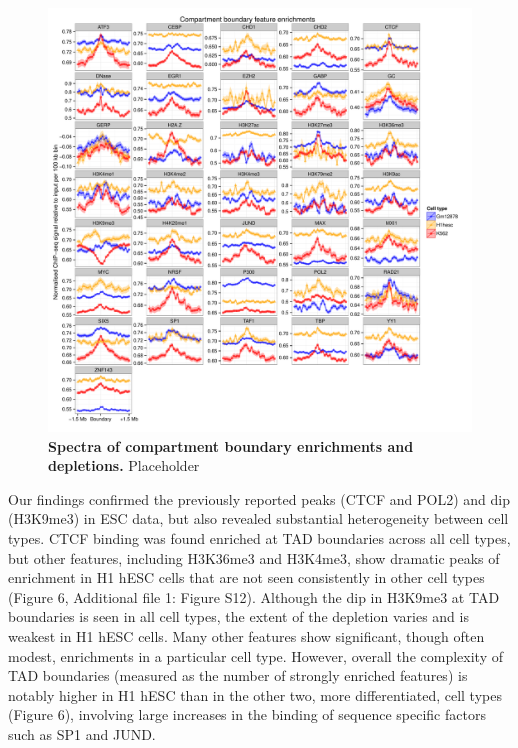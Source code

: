 \documentclass[a4paper,10pt,oneside]{book}
\begin{document}
\begin{figure}
\begin{center} 
\includegraphics[width=1.12\textwidth]{figs/allcompartments.pdf}
\captionsetup{width=\textwidth}
\caption{ {\bf Spectra of compartment boundary enrichments and depletions.}
Placeholder
}\label{fig:allcompartments}
\end{center}
\end{figure} 

Our findings confirmed the previously reported peaks (CTCF and POL2) and dip (H3K9me3) in ESC data, but also revealed substantial heterogeneity between cell types. CTCF binding was found enriched at TAD boundaries across all cell types, but other features, including H3K36me3 and H3K4me3, show dramatic peaks of enrichment in H1 hESC cells that are not seen consistently in other cell types (Figure 6, Additional file 1: Figure S12). Although the dip in H3K9me3 at TAD boundaries is seen in all cell types, the extent of the depletion varies and is weakest in H1 hESC cells. Many other features show significant, though often modest, enrichments in a particular cell type. However, overall the complexity of TAD boundaries (measured as the number of strongly enriched features) is notably higher in H1 hESC than in the other two, more differentiated, cell types (Figure 6), involving large increases in the binding of sequence specific factors such as SP1 and JUND.
\end{document}
